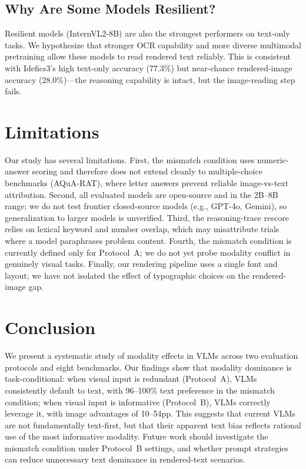 \documentclass[11pt]{article}
\begin{document}
\subsection{Why Are Some Models Resilient?}

Resilient models (InternVL2-8B) are also the strongest performers on text-only tasks. We hypothesize that stronger OCR capability and more diverse multimodal pretraining allow these models to read rendered text reliably. This is consistent with Idefics3's high text-only accuracy (77.3\%) but near-chance rendered-image accuracy (28.0\%)---the reasoning capability is intact, but the image-reading step fails.

\section{Limitations}

Our study has several limitations. First, the mismatch condition uses numeric-answer scoring and therefore does not extend cleanly to multiple-choice benchmarks (AQuA-RAT), where letter answers prevent reliable image-vs-text attribution. Second, all evaluated models are open-source and in the 2B--8B range; we do not test frontier closed-source models (e.g., GPT-4o, Gemini), so generalization to larger models is unverified. Third, the reasoning-trace rescore relies on lexical keyword and number overlap, which may misattribute trials where a model paraphrases problem content. Fourth, the mismatch condition is currently defined only for Protocol~A; we do not yet probe modality conflict in genuinely visual tasks. Finally, our rendering pipeline uses a single font and layout; we have not isolated the effect of typographic choices on the rendered-image gap.

\section{Conclusion}

We present a systematic study of modality effects in VLMs across two evaluation protocols and eight benchmarks. Our findings show that modality dominance is task-conditional: when visual input is redundant (Protocol~A), VLMs consistently default to text, with 96--100\% text preference in the mismatch condition; when visual input is informative (Protocol~B), VLMs correctly leverage it, with image advantages of 10--54pp. This suggests that current VLMs are not fundamentally text-first, but that their apparent text bias reflects rational use of the most informative modality. Future work should investigate the mismatch condition under Protocol~B settings, and whether prompt strategies can reduce unnecessary text dominance in rendered-text scenarios.



\end{document}
